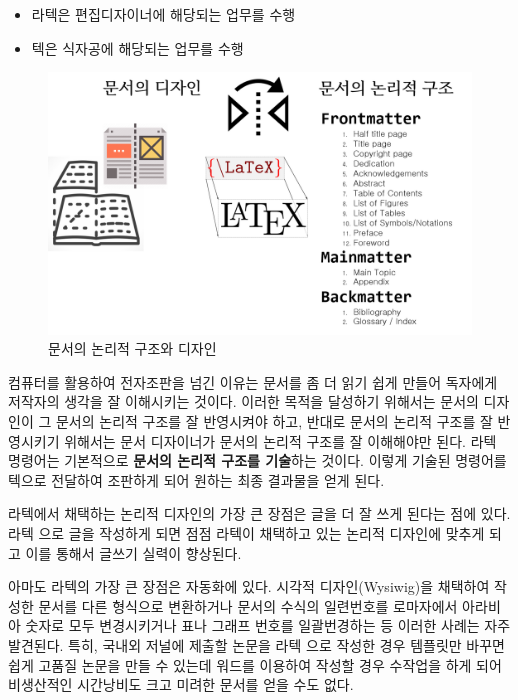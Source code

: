 \documentclass[
  letterpaper,
]{book}
\providecommand{\tightlist}{%
  \setlength{\itemsep}{0pt}\setlength{\parskip}{0pt}}\usepackage{longtable,booktabs,array}
\begin{document}
\begin{itemize}
\tightlist
\item
  라텍은 편집디자이너에 해당되는 업무를 수행
\item
  텍은 식자공에 해당되는 업무를 수행
\end{itemize}

\begin{figure}

{\centering \includegraphics{images/document-logical-design.png}

}

\caption{문서의 논리적 구조와 디자인}

\end{figure}

컴퓨터를 활용하여 전자조판을 넘긴 이유는 문서를 좀 더 읽기 쉽게 만들어
독자에게 저작자의 생각을 잘 이해시키는 것이다. 이러한 목적을 달성하기
위해서는 문서의 디자인이 그 문서의 논리적 구조를 잘 반영시켜야 하고,
반대로 문서의 논리적 구조를 잘 반영시키기 위해서는 문서 디자이너가
문서의 논리적 구조를 잘 이해해야만 된다. 라텍 명령어는 기본적으로
\textbf{문서의 논리적 구조를 기술}하는 것이다. 이렇게 기술된 명령어를
텍으로 전달하여 조판하게 되어 원하는 최종 결과물을 얻게 된다.

라텍에서 채택하는 논리적 디자인의 가장 큰 장점은 글을 더 잘 쓰게 된다는
점에 있다. 라텍 으로 글을 작성하게 되면 점점 라텍이 채택하고 있는 논리적
디자인에 맞추게 되고 이를 통해서 글쓰기 실력이 향상된다.

아마도 라텍의 가장 큰 장점은 자동화에 있다. 시각적 디자인(Wysiwig)을
채택하여 작성한 문서를 다른 형식으로 변환하거나 문서의 수식의 일련번호를
로마자에서 아라비아 숫자로 모두 변경시키거나 표나 그래프 번호를
일괄번경하는 등 이러한 사례는 자주 발견된다. 특히, 국내외 저널에 제출할
논문을 라텍 으로 작성한 경우 템플릿만 바꾸면 쉽게 고품질 논문을 만들 수
있는데 워드를 이용하여 작성할 경우 수작업을 하게 되어 비생산적인
시간낭비도 크고 미려한 문서를 얻을 수도 없다.
\end{document}
